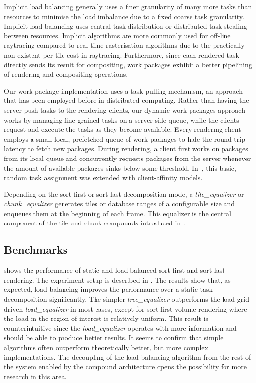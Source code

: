 Implicit load balancing generally uses a finer granularity of many more tasks
than resources to minimise the load imbalance due to a fixed coarse task
granularity. Implicit load balancing uses central task distribution or
distributed task stealing between resources. Implicit algorithms are more
commonly used for off-line raytracing compared to real-time rasterisation
algorithms due to the practically non-existent per-tile cost in raytracing.
Furthermore, since each rendered task directly sends its result for
compositing, work packages exhibit a better pipelining of rendering and
compositing operations.

Our work package implementation uses a task pulling mechanism, an approach that
has been employed before in distributed computing. Rather than having the
server push tasks to the rendering clients, our dynamic work packages approach
works by managing fine grained tasks on a server side queue, while the clients
request and execute the tasks as they become available. Every rendering client
employs a small local, prefetched queue of work packages to hide the round-trip
latency to fetch new packages. During rendering, a client first works on
packages from its local queue and concurrently requests packages from the
server whenever the amount of available packages sinks below some threshold.
In~\cite{SPEP:16}, this basic, random task assignment was extended with
client-affinity models.

Depending on the sort-first or sort-last decomposition mode, a {\em
tile\_equalizer} or {\em chunk\_equalizer} generates tiles or database ranges
of a configurable size and enqueues them at the beginning of each frame. This
equalizer is the central component of the tile and chunk compounds introduced
in .


\subsection{Benchmarks}

 shows the performance of static and load balanced sort-first
and sort-last rendering. The experiment setup is described in \cite{ESP:18}.
The results show that, as expected, load balancing improves the performance
over a static task decomposition significantly. The simpler
{\em tree\_equalizer} outperforms the load grid-driven
{\em load\_equalizer} in most cases, except for sort-first volume rendering
where the load in the region of interest is relatively uniform. This result is
counterintuitive since the {\em load\_equalizer} operates with more
information and should be able to produce better results. It seems to confirm
that simple algorithms often outperform theoretically better, but more complex
implementations. The decoupling of the load balancing algorithm from the rest
of the system enabled by the compound architecture opens the possibility for
more research in this area.

